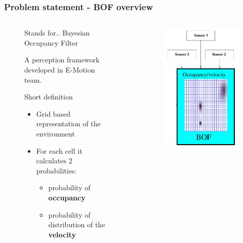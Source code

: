 \documentclass{beamer}
\begin{document}
	
	\begin{frame}
		\frametitle{Problem statement - BOF overview}
	\small
		  \begin{columns}[t]
		  \begin{column}{5cm}
			\begin{figure}[h]
			\center
	
		\begin{block}{Stands for..}
			Bayesian Occupancy Filter
			
			A perception framework developed in E-Motion team.  \cite{coue2003}
		\end{block}
	
			\begin{block}{Short definition}
			\begin{itemize}		
				 \item Grid based representation of the environment
				 \item For each cell it calculates 2 probabilities:
			 		\begin{itemize}		
				 		\item probability of \textbf{occupancy}
				 		\item probability of distribution of the \textbf{velocity}
	 				\end{itemize}		
				 
			\end{itemize}				
			\end{block}
		\end{figure}	
		  \end{column}
		  
		  \begin{column}{5cm}
			\begin{figure}[h]
			\center
			\includegraphics[scale=0.45]{img/bof}
		\end{figure}	
		  \end{column}
		 \end{columns}
		
	\end{frame}
\end{document}
